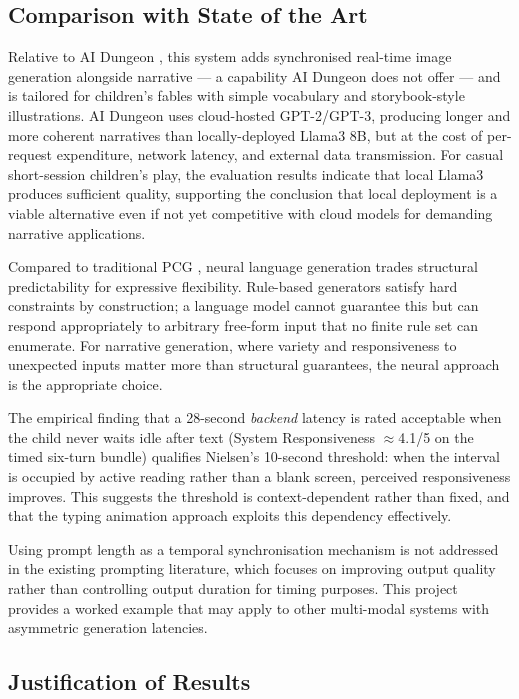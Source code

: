 \documentclass[12pt,a4paper]{article}
\begin{document}
    \subsection{Comparison with State of the Art}

Relative to AI Dungeon \cite{walton2019aidungeon}, this system adds synchronised real-time image generation alongside narrative --- a capability AI Dungeon does not offer --- and is tailored for children's fables with simple vocabulary and storybook-style illustrations. AI Dungeon uses cloud-hosted GPT-2/GPT-3, producing longer and more coherent narratives than locally-deployed Llama3 8B, but at the cost of per-request expenditure, network latency, and external data transmission. For casual short-session children's play, the evaluation results indicate that local Llama3 produces sufficient quality, supporting the conclusion that local deployment is a viable alternative even if not yet competitive with cloud models for demanding narrative applications.

Compared to traditional PCG \cite{togelius2011assessing}, neural language generation trades structural predictability for expressive flexibility. Rule-based generators satisfy hard constraints by construction; a language model cannot guarantee this but can respond appropriately to arbitrary free-form input that no finite rule set can enumerate. For narrative generation, where variety and responsiveness to unexpected inputs matter more than structural guarantees, the neural approach is the appropriate choice.

The empirical finding that a 28-second \emph{backend} latency is rated acceptable when the child never waits idle after text (System Responsiveness $\approx$4.1/5 on the timed six-turn bundle) qualifies Nielsen's \cite{nielsen1994usability} 10-second threshold: when the interval is occupied by active reading rather than a blank screen, perceived responsiveness improves. This suggests the threshold is context-dependent rather than fixed, and that the typing animation approach exploits this dependency effectively.

Using prompt length as a temporal synchronisation mechanism is not addressed in the existing prompting literature, which focuses on improving output quality rather than controlling output duration for timing purposes. This project provides a worked example that may apply to other multi-modal systems with asymmetric generation latencies.

    \subsection{Justification of Results}
\end{document}
